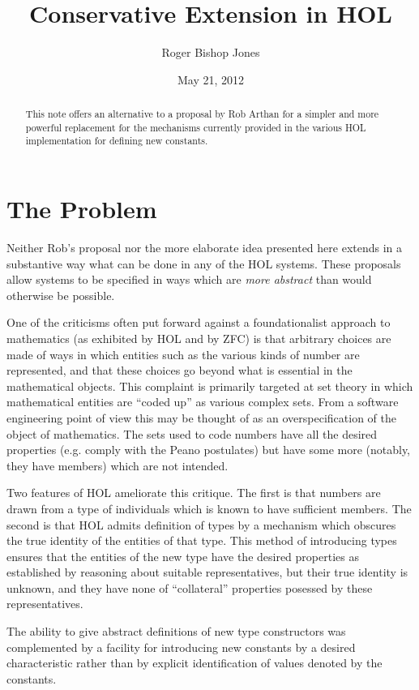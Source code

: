 \documentclass[12pt]{article}
\title{Conservative Extension in HOL}
\author{Roger Bishop Jones}
\date{May 21,  2012}
\begin{document}
\maketitle

\begin{abstract}
This note offers an alternative to a proposal by Rob Arthan for a simpler and more powerful replacement for the mechanisms currently provided in the various HOL implementation for defining new constants.

\end{abstract}

\section{The Problem}

Neither Rob's proposal nor the more elaborate idea presented here extends in a substantive way what can be done in any of the HOL systems.
These proposals allow systems to be specified in ways which are \emph{more abstract} than would otherwise be possible.

One of the criticisms often put forward against a foundationalist approach to mathematics (as exhibited by HOL and by ZFC) is that arbitrary choices are made of ways in which entities such as the various kinds of number are represented, and that these choices go beyond what is essential in the mathematical objects.
This complaint is primarily targeted at set theory in which mathematical entities are ``coded up'' as various complex sets.
From a software engineering point of view this may be thought of as an overspecification of the object of mathematics.
The sets used to code numbers have all the desired properties (e.g. comply with the Peano postulates) but have some more (notably, they have members) which are not intended.

Two features of HOL ameliorate this critique.
The first is that numbers are drawn from a type of individuals which is known to have sufficient members.
The second is that HOL admits definition of types by a mechanism which obscures the true identity of the entities of that type.
This method of introducing types ensures that the entities of the new type have the desired properties as established by reasoning about suitable representatives, but their true identity is unknown, and they have none of ``collateral'' properties posessed by these representatives.

The ability to give abstract definitions of new type constructors was complemented by a facility for introducing new constants by a desired characteristic rather than by explicit identification of values denoted by the constants.
\end{document}
